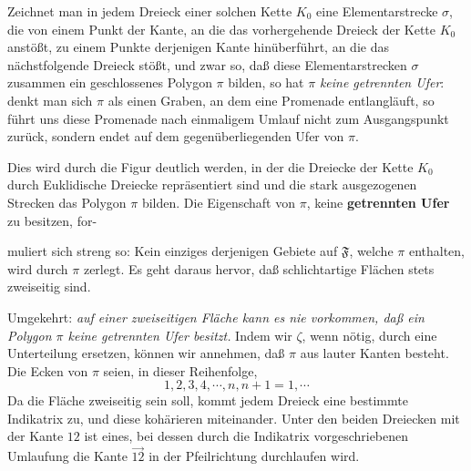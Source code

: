 \documentclass{article}
\begin{document}
Zeichnet man in jedem Dreieck einer solchen Kette $K_0$ eine Elementarstrecke $\sigma$, die von einem Punkt der Kante, an die das vorhergehende Dreieck der Kette $K_0$ anstößt, zu einem Punkte derjenigen Kante hinüberführt, an die das nächstfolgende Dreieck stößt, und zwar so, daß diese Elementarstrecken $\sigma$ zusammen ein geschlossenes Polygon $\pi$ bilden, so hat $\pi$ \emph{keine getrennten Ufer}: denkt man sich $\pi$ als einen Graben, an dem eine Promenade entlangläuft, so führt uns diese Promenade nach einmaligem Umlauf nicht zum Ausgangspunkt zurück, sondern endet auf dem gegenüberliegenden Ufer von $\pi$.


Dies wird durch die Figur deutlich werden, in der die Dreiecke der Kette $K_0$ durch Euklidische Dreiecke repräsentiert sind und die stark ausgezogenen Strecken das Polygon $\pi$ bilden. Die Eigenschaft von $\pi$, keine \textbf{getrennten Ufer} zu besitzen, for-

muliert sich streng so: Kein einziges derjenigen Gebiete auf $\mathfrak{F}$, welche $\pi$ enthalten, wird durch $\pi$ zerlegt. Es geht daraus hervor, daß schlichtartige Flächen stets zweiseitig sind.

Umgekehrt: \emph{auf einer zweiseitigen Fläche kann es nie vorkommen, daß ein Polygon $\pi$ keine getrennten Ufer besitzt.} Indem wir $\zeta$, wenn nötig, durch eine Unterteilung ersetzen, können wir annehmen, daß $\pi$ aus lauter Kanten besteht. Die Ecken von $\pi$ seien, in dieser Reihenfolge,
\[ 1, 2, 3, 4, \cdots, n, n + 1 = 1, \cdots \]
Da die Fläche zweiseitig sein soll, kommt jedem Dreieck eine bestimmte Indikatrix zu, und diese kohärieren miteinander. Unter den beiden Dreiecken mit der Kante $12$ ist eines, bei dessen durch die Indikatrix vorgeschriebenen Umlaufung die Kante $\overrightarrow{12}$ in der Pfeilrichtung durchlaufen wird.

\end{document}
